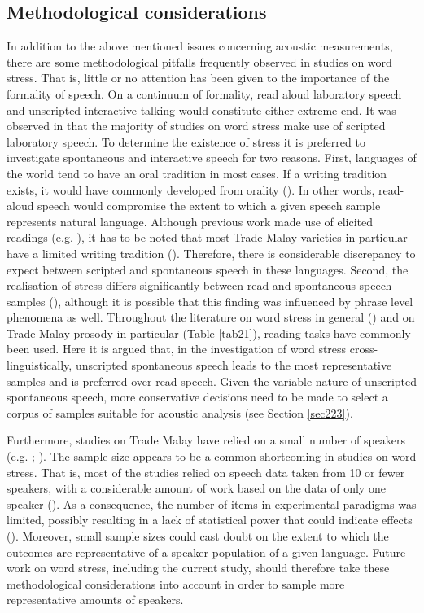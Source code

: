 \subsection{Methodological considerations} \label{sec214}
In addition to the above mentioned issues concerning acoustic measurements, there are some methodological pitfalls frequently observed in studies on word stress. That is, little or no attention has been given to the importance of the formality of speech. On a continuum of formality, read aloud laboratory speech and unscripted interactive talking would constitute either extreme end. It was observed in \citet{roettger_methodological_2017} that the majority of studies on word stress make use of scripted laboratory speech. To determine the existence of stress it is preferred to investigate spontaneous and interactive speech for two reasons. First, languages of the world tend to have an oral tradition in most cases. If a writing tradition exists, it would have commonly developed from orality (\citealt{ong_orality_1982}). In other words, read-aloud speech would compromise the extent to which a given speech sample represents natural language. Although previous work made use of elicited readings (e.g. \citealt{maskikit-essed_no_2016}), it has to be noted that most Trade Malay varieties in particular have a limited writing tradition (\citealt{paauw_malay_2009}). Therefore, there is considerable discrepancy to expect between scripted and spontaneous speech in these languages. Second, the realisation of stress differs significantly between read and spontaneous speech samples (\citealt{howell_comparison_1991}), although it is possible that this finding was influenced by phrase level phenomena as well. Throughout the literature on word stress in general (\citealt{roettger_methodological_2017}) and on Trade Malay prosody in particular (Table \ref{tab21}), reading tasks have commonly been used. Here it is argued that, in the investigation of word stress cross-linguistically, unscripted spontaneous speech leads to the most representative samples and is preferred over read speech. Given the variable nature of unscripted spontaneous speech, more conservative decisions need to be made to select a corpus of samples suitable for acoustic analysis (see Section \ref{sec223}).\par

Furthermore, studies on Trade Malay have relied on a small number of speakers (e.g. \citealt{maskikit-essed_no_2016}; \citealt{steinhauer_notes_1983}). The sample size appears to be a common shortcoming in studies on word stress. That is, most of the studies relied on speech data taken from 10 or fewer speakers, with a considerable amount of work based on the data of only one speaker (\citealt{roettger_methodological_2017}). As a consequence, the number of items in experimental paradigms was limited, possibly resulting in a lack of statistical power that could indicate effects (\citealt{roettger_methodological_2017}). Moreover, small sample sizes could cast doubt on the extent to which the outcomes are representative of a speaker population of a given language. Future work on word stress, including the current study, should therefore take these methodological considerations into account in order to sample more representative amounts of speakers.

